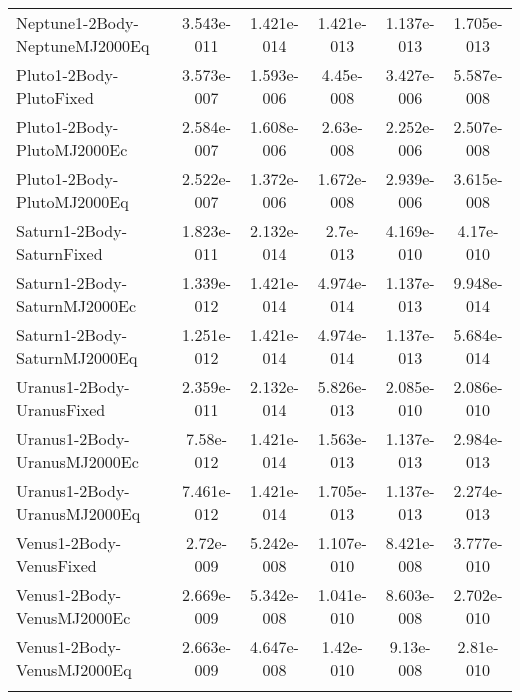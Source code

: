 \begin{table}[htbp!]
\begin{tabular}{lccccc}
         Neptune1-2Body-NeptuneMJ2000Eq & 3.543e-011 & 1.421e-014 & 1.421e-013 & 1.137e-013 & 1.705e-013 \\
         Pluto1-2Body-PlutoFixed & 3.573e-007 & 1.593e-006 & 4.45e-008 & 3.427e-006 & 5.587e-008 \\
         Pluto1-2Body-PlutoMJ2000Ec & 2.584e-007 & 1.608e-006 & 2.63e-008 & 2.252e-006 & 2.507e-008 \\
         Pluto1-2Body-PlutoMJ2000Eq & 2.522e-007 & 1.372e-006 & 1.672e-008 & 2.939e-006 & 3.615e-008 \\
         Saturn1-2Body-SaturnFixed & 1.823e-011 & 2.132e-014 & 2.7e-013 & 4.169e-010 & 4.17e-010 \\
         Saturn1-2Body-SaturnMJ2000Ec & 1.339e-012 & 1.421e-014 & 4.974e-014 & 1.137e-013 & 9.948e-014 \\
         Saturn1-2Body-SaturnMJ2000Eq & 1.251e-012 & 1.421e-014 & 4.974e-014 & 1.137e-013 & 5.684e-014 \\
         Uranus1-2Body-UranusFixed & 2.359e-011 & 2.132e-014 & 5.826e-013 & 2.085e-010 & 2.086e-010 \\
         Uranus1-2Body-UranusMJ2000Ec & 7.58e-012 & 1.421e-014 & 1.563e-013 & 1.137e-013 & 2.984e-013 \\
         Uranus1-2Body-UranusMJ2000Eq & 7.461e-012 & 1.421e-014 & 1.705e-013 & 1.137e-013 & 2.274e-013 \\
         Venus1-2Body-VenusFixed & 2.72e-009 & 5.242e-008 & 1.107e-010 & 8.421e-008 & 3.777e-010 \\
         Venus1-2Body-VenusMJ2000Ec & 2.669e-009 & 5.342e-008 & 1.041e-010 & 8.603e-008 & 2.702e-010 \\
         Venus1-2Body-VenusMJ2000Eq & 2.663e-009 & 4.647e-008 & 1.42e-010 & 9.13e-008 & 2.81e-010 \\
      \hline\hline
      \label{Table: WinGMAT-MacGMAT CS Parameters Set 5} 
\end{tabular}
\end{table}
